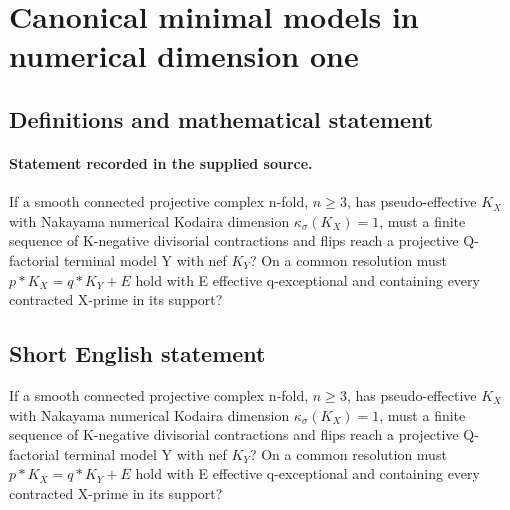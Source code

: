 \documentclass[11pt]{article}
\begin{document}
\section*{Canonical minimal models in numerical dimension one}\label{30007019}
\subsection{Definitions and mathematical statement}
\paragraph{Statement recorded in the supplied source.}
If a smooth connected projective complex n-fold, $n\geq 3$, has pseudo-effective $K_X$ with Nakayama numerical Kodaira dimension $\kappa _\sigma (K_X)=1$, must a finite sequence of K-negative divisorial contractions and flips reach a projective Q-factorial terminal model Y with nef $K_Y$? On a common resolution must $p*K_X=q*K_Y+E$ hold with E effective q-exceptional and containing every contracted X-prime in its support?
\subsection{Short English statement}
If a smooth connected projective complex n-fold, $n\geq 3$, has pseudo-effective $K_X$ with Nakayama numerical Kodaira dimension $\kappa _\sigma (K_X)=1$, must a finite sequence of K-negative divisorial contractions and flips reach a projective Q-factorial terminal model Y with nef $K_Y$? On a common resolution must $p*K_X=q*K_Y+E$ hold with E effective q-exceptional and containing every contracted X-prime in its support?
\end{document}
